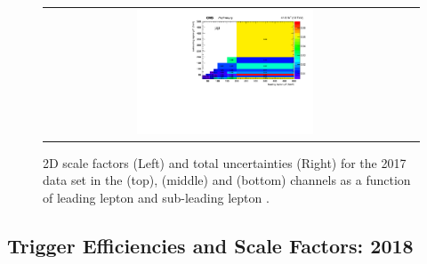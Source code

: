 {\begin{figure}[h]
\begin{center}
\begin{tabular}{cc}
      \includegraphics[width=0.50\textwidth]{fig_2017_TrigSF/h2D_lepABpt_mumu_BinErrors.pdf}\\
    \end{tabular}
    \caption{2D scale factors (Left) and total uncertainties (Right) for the 2017 data set in the \emu (top), \ee (middle) and \mumu (bottom) channels as a function of leading lepton \pT and sub-leading lepton \pT.}
    \label{TrigSF_2017_4}
  \end{center}
\end{figure}

\clearpage
\subsection{Trigger Efficiencies and Scale Factors: 2018}
\label{TrigSFResults2018}

}
